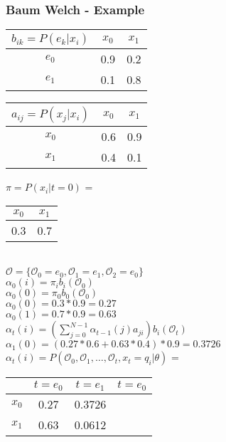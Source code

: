\begin{frame}[fragile]
	\frametitle{Baum Welch - Example}
  \begin{table}
  \centering
  \begin{tabular}{| c | c | c |}
  	\hline
    $b_{ik} = P(e_k|x_i)$ & $x_0$ & $x_1$ \\ \hline
    $e_0$                 & 0.9   & 0.2   \\ \hline
    $e_1$                 & 0.1   & 0.8   \\ \hline
  \end{tabular}
  \begin{tabular}{| c | c | c |}
  	\hline
    $a_{ij} = P(x_j|x_i)$ & $x_0$ & $x_1$ \\ \hline
    $x_0$                 & 0.6   & 0.9   \\ \hline
    $x_1$                 & 0.4   & 0.1   \\ \hline
  \end{tabular}
  $\pi = P(x_i|t=0)$ =
  \begin{tabular}{| c | c |}
  	\hline
    $x_0$ & $x_1$ \\ \hline
    0.3   & 0.7   \\ \hline
  \end{tabular}\\
  $\mathcal{O} = \{\mathcal{O}_0 = e_0, \mathcal{O}_1 = e_1, \mathcal{O}_2 = e_0\}$\\
  $\alpha_0(i) = \pi_i b_i(\mathcal{O}_0)$\\
  $\alpha_0(0) = \pi_0 b_0(\mathcal{O}_0)$\\
  $\alpha_0(0) = 0.3 * 0.9 = 0.27$\\
  $\alpha_0(1) = 0.7 * 0.9 = 0.63$\\
  $\alpha_t(i) = \left(\sum\limits_{j=0}^{N-1} \alpha_{t-1}(j)a_{ji}\right)b_i(\mathcal{O}_t)$\\
  $\alpha_1(0) = (0.27 * 0.6 + 0.63 * 0.4) * 0.9 = 0.3726$\\
  $\alpha_t(i) = P(\mathcal{O}_0, \mathcal{O}_1, \dots ,\mathcal{O}_t , x_t = q_i | \theta)$ =
  \begin{tabular}{| c | c | c | c |}
  	\hline
          & $t=e_0$ & $t=e_1$ & $t=e_0$ \\ \hline
    $x_0$ & 0.27    & 0.3726  &  \\ \hline
    $x_1$ & 0.63    & 0.0612  &  \\ \hline
  \end{tabular}
\end{table}
\end{frame}






